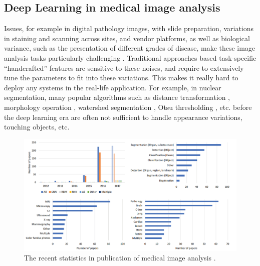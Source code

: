 \subsection{Deep Learning in medical image analysis} 
\label{sst:problem_overview}
Issues, for example in digital pathology images, with slide preparation, variations in staining and scanning across sites, and vendor platforms, as well as biological variance, such as the presentation of different grades of disease, make these image analysis tasks particularly challenging \cite{reviewofdeeplearning1}. Traditional approaches based task-specific “handcrafted” features are sensitive to these noises, and require to extensively tune the parameters to fit into these variations. This makes it really hard to deploy any systems in the real-life application. For example, in nuclear segmentation, many popular algorithms such as distance transformation \cite{distancetransform1, distancetransform2}, morphology operation \cite{morphology1, morphology2}, watershed segmentation \cite{watershed}, Otsu thresholding \cite{Otsu}, etc. before the deep learning era are often not sufficient to handle appearance variations, touching objects, etc. 

\begin{figure}
    \centering
    \includegraphics[width=\textwidth]{resources/1-1-num_papers.png}
    \caption{The recent statistics in publication of medical image analysis \cite{survey_on_medical_image_analysis}.}
    \label{fig:1-1-numpapers}
\end{figure}

